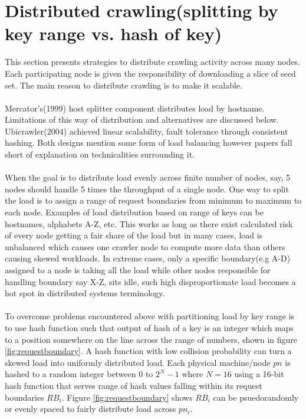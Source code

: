 \section{Distributed crawling(splitting by key range vs. hash of key)}
This section presents strategies to distribute crawling activity across many nodes. Each participating
node is given the responsibility of downloading a slice of seed set. The main reason to distribute
crawling is to make it scalable.  
\\
\\
Mercator's\cite{mercator}(1999) host splitter component distributes load by hostname. Limitations of this way of distribution and alternatives are discussed below. Ubicrawler\cite{ubicrawler}(2004) achieved linear scalability, fault tolerance through consistent hashing\cite{consisthash}. Both designs mention some form of
load balancing however papers fall short of explanation on technicalities surrounding it.
\\
\\
When the goal is to distribute load evenly across finite number of nodes, say, 5 nodes should handle 5 times the throughput
of a single node. One way to split the load is to assign a range of request boundaries from minimum to
maximum to each node. Examples of load distribution based on range of keys can be hostnames, alphabets A-Z, etc. This works
as long as there exist calculated risk of every node getting a fair share of the load but in many cases,
load is unbalanced which causes one crawler node to compute more data than others causing skewed
workloads\cite{consisthash}. In extreme cases, only a specific boundary(e.g A-D) assigned to a node is taking all the load while other nodes responsible for handling boundary say X-Z, sits idle, such high disproportionate load becomes a hot spot\cite{consisthash} in distributed systems terminology.
\\
\\
To overcome problems encountered above with partitioning load by key range is to use hash function such that output of hash of a key is an integer which maps to a position somewhere on the line across the range of
numbers, shown in figure \ref{fig:requestboundary}. A hash function with low collision probability can
turn a skewed load into uniformly distributed load. Each physical machine/node $pn$ is hashed to a random integer between $0$ to $2^N-1$ where $N=16$ using a 16-bit hash function that serves range of hash values falling
within its request boundaries $RB_i$. Figure \ref{fig:requestboundary} shows $RB_i$ can be psuedorandomly or evenly spaced to fairly distribute load across $pn_i$.

